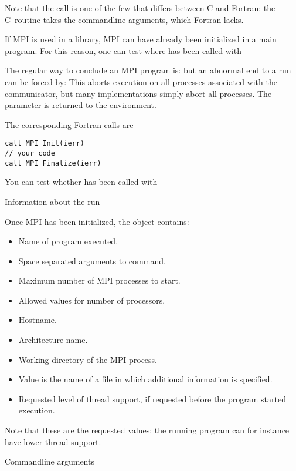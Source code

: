 Note that the  call is one of the few that differs between C and Fortran:
the C~routine takes the commandline arguments, which Fortran lacks.

If MPI is used in a library, MPI can have already been initialized in a main program.
For this reason, one can test where  has been called with
%
%

The regular way to conclude an MPI program is:
%
%
but an abnormal end to a run can be forced by:
%
%
This aborts execution on all processes associated with the communicator,
but many implementations simply abort all processes. The  parameter
is returned to the environment.

The corresponding Fortran calls are
\begin{verbatim}
call MPI_Init(ierr)
// your code
call MPI_Finalize(ierr)
\end{verbatim}

You can test whether  has been called with
%

 {Information about the run}

Once MPI has been initialized, the  object contains:
\begin{itemize}
\item {}
  Name of program executed.
\item  {}
  Space separated arguments to command.
\item  {}
  Maximum number of MPI processes to start.
\item   {}
  Allowed values for number of processors.
\item   {}
  Hostname.
\item   {}
  Architecture name.
\item   {}
  Working directory of the MPI process.
\item   {}
  Value is the name of a file in which additional information is specified.
\item   {}
  Requested level of thread support, if requested before the program started execution.
\end{itemize}
Note that these are the requested values; the running program can for instance
have lower thread support.

 {Commandline arguments}

